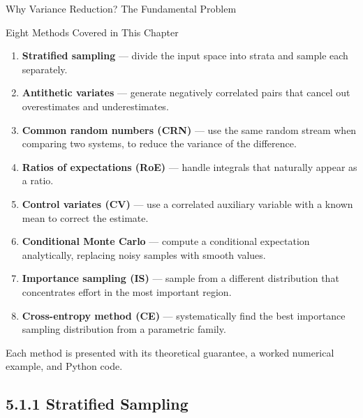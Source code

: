 \documentclass[aspectratio=169,10pt]{beamer}
\begin{document}
\begin{frame}[allowframebreaks]{Why Variance Reduction? The Fundamental Problem}
\begin{block}{Eight Methods Covered in This Chapter}
  \begin{enumerate}
    \item \textbf{Stratified sampling} --- divide the input space into strata
          and sample each separately.
    \item \textbf{Antithetic variates} --- generate negatively correlated pairs
          that cancel out overestimates and underestimates.
    \item \textbf{Common random numbers (CRN)} --- use the same random stream
          when comparing two systems, to reduce the variance of the difference.
    \item \textbf{Ratios of expectations (RoE)} --- handle integrals that
          naturally appear as a ratio.
    \item \textbf{Control variates (CV)} --- use a correlated auxiliary
          variable with a known mean to correct the estimate.
    \item \textbf{Conditional Monte Carlo} --- compute a conditional
          expectation analytically, replacing noisy samples with smooth values.
    \item \textbf{Importance sampling (IS)} --- sample from a different
          distribution that concentrates effort in the most important region.
    \item \textbf{Cross-entropy method (CE)} --- systematically find the best
          importance sampling distribution from a parametric family.
  \end{enumerate}
\end{block}

Each method is presented with its theoretical guarantee, a worked numerical
example, and Python code.

\end{frame}

\subsection{5.1.1 Stratified Sampling}
\end{document}
